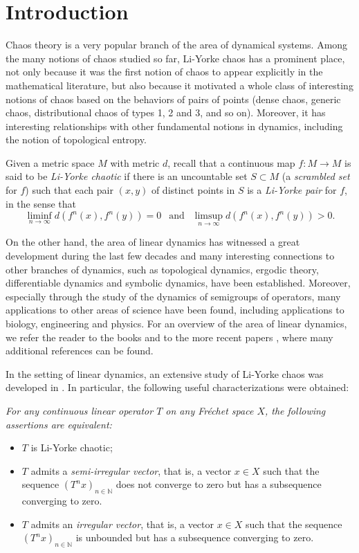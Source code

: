 \documentclass[12pt]{amsart}
\theoremstyle{theorem}
\theoremstyle{definition}
\theoremstyle{remark} \theoremstyle{question} \theoremstyle{example}
\newcommand{\N}{\mathbb{N}}
\begin{document}

\section{Introduction}

Chaos theory is a very popular branch of the area of dynamical systems. 
Among the many notions of chaos studied so far, Li-Yorke chaos has a prominent place, not only because it was the first notion of chaos to appear explicitly in the mathematical literature, but also because it motivated a whole class of interesting notions of chaos based on the behaviors of pairs of points (dense chaos, generic chaos, distributional chaos of types 1, 2 and 3, and so on). 
Moreover, it has interesting relationships with other fundamental notions in dynamics, including the notion of topological entropy.

\smallskip
Given a metric space $M$ with metric $d$, recall that a continuous map $f : M \to M$ is said to be {\em Li-Yorke chaotic} if there is an uncountable set $S \subset M$ (a {\em scrambled set} for $f$) such that each pair $(x,y)$ of distinct points in $S$ is a {\em Li-Yorke pair} for $f$, in the sense that
\[
\liminf_{n \to \infty} d(f^n(x),f^n(y)) = 0 \ \ \text{ and } \ \ \limsup_{n \to \infty} d(f^n(x),f^n(y)) > 0.
\]

On the other hand, the area of linear dynamics has witnessed a great development during the last few decades and many interesting connections to other branches of dyna\-mics, such as topological dynamics, ergodic theory, differentiable dynamics and symbolic dynamics, have been established. Moreover, especially through the study of the dynamics of semigroups of operators, many applications to other areas of science have been found, including applications to biology, engineering and physics. For an overview of the area of linear dynamics, we refer the reader to the books \cite{FBayEMat09,KGroAPer11} and to the more recent papers \cite{FBayEMat16,BerBonPer20,NBerAMes20,NBerAMes21,NBerAPer24,BesMenPerPui19,EDAnMMai23,GriMatMen21}, 
where many additional references can be found.

\smallskip
In the setting of linear dynamics, an extensive study of Li-Yorke chaos was developed in \cite{BerBonMarPer11,BerBonMulPer15}.
In particular, the following useful characterizations were obtained: 
{\it For any continuous linear operator $T$ on any Fr\'echet space $X$, the following assertions are equivalent: 
\begin{itemize}
\item [\rm (i)] $T$ is Li-Yorke chaotic;
\item [\rm (ii)] $T$ admits a {\em semi-irregular vector}, that is, a vector $x \in X$ such that the sequence $(T^n x)_{n \in \N}$
  does not converge to zero but has a subsequence converging to zero.
\item [\rm (iii)] $T$ admits an {\em irregular vector}, that is, a vector $x \in X$ such that the sequence $(T^n x)_{n \in \N}$
  is unbounded but has a subsequence converging to zero.
\end{itemize}}
\end{document}
